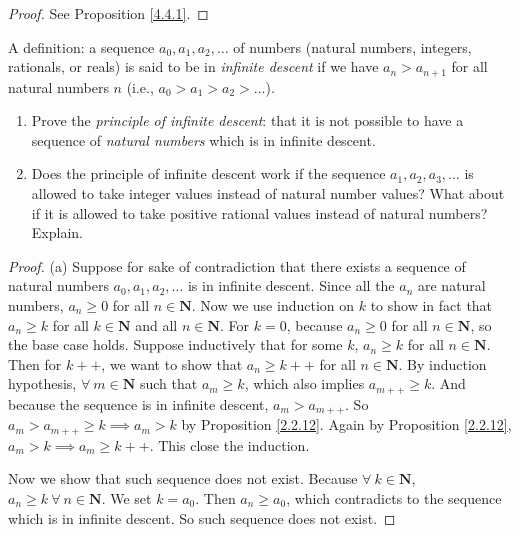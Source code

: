 \begin{proof}
See Proposition \ref{4.4.1}.
\end{proof}

\begin{exercise}\label{ex 4.4.2}
A definition: a sequence \(a_0, a_1, a_2, \dots\) of numbers (natural numbers, integers, rationals, or reals) is said to be in \emph{infinite descent} if we have \(a_n > a_{n + 1}\) for all natural numbers \(n\)
(i.e., \(a_0 > a_1 > a_2 > \dots\)).
\begin{enumerate}
    \item Prove the \emph{principle of infinite descent}:
    that it is not possible to have a sequence of \emph{natural numbers} which is in infinite descent.
    \item Does the principle of infinite descent work if the sequence \(a_1, a_2, a_3, \dots\) is allowed to take integer values instead of natural number values?
    What about if it is allowed to take positive rational values instead of natural numbers?
    Explain.
\end{enumerate}
\end{exercise}

\begin{proof}{(a)}
Suppose for sake of contradiction that there exists a sequence of natural numbers \(a_0, a_1, a_2, \dots\) is in infinite descent.
Since all the \(a_n\) are natural numbers, \(a_n \geq 0\) for all \(n \in \mathbf{N}\).
Now we use induction on \(k\) to show in fact that \(a_n \geq k\) for all \(k \in \mathbf{N}\) and all \(n \in \mathbf{N}\).
For \(k = 0\), because \(a_n \geq 0\) for all \(n \in \mathbf{N}\), so the base case holds.
Suppose inductively that for some \(k\), \(a_n \geq k\) for all \(n \in \mathbf{N}\).
Then for \(k++\), we want to show that \(a_n \geq k++\) for all \(n \in \mathbf{N}\).
By induction hypothesis, \(\forall\ m \in \mathbf{N}\) such that \(a_m \geq k\), which also implies \(a_{m++} \geq k\).
And because the sequence is in infinite descent, \(a_m > a_{m++}\).
So \(a_m > a_{m++} \geq k \implies a_m > k\) by Proposition \ref{2.2.12}.
Again by Proposition \ref{2.2.12}, \(a_m > k \implies a_m \geq k++\).
This close the induction.

Now we show that such sequence does not exist.
Because \(\forall\ k \in \mathbf{N}\), \(a_n \geq k \ \forall\ n \in \mathbf{N}\).
We set \(k = a_0\).
Then \(a_n \geq a_0\), which contradicts to the sequence which is in infinite descent.
So such sequence does not exist.
\end{proof}

